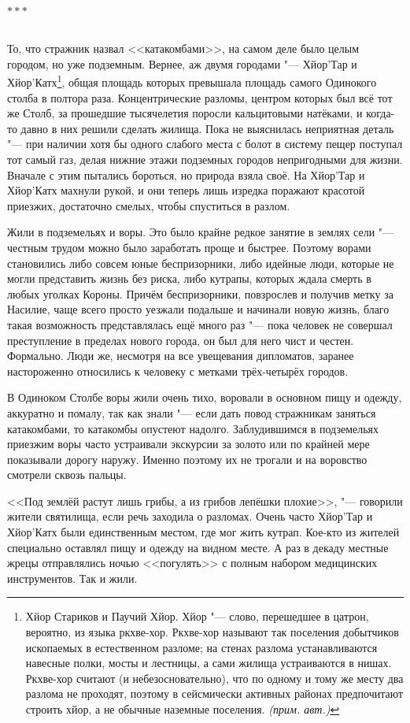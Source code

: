 \documentclass[a4paper,10pt]{book}
\newcommand{\razd}{~\\{\centering\Large\bfseries$\ast \ast \ast$\par}~\\}
\newcommand{\authornote}{\textit{(прим. авт.)}}
\begin{document}
\razd

То, что стражник назвал <<катакомбами>>, на самом деле было целым городом, но уже подземным.
Вернее, аж двумя городами "--- Хйор'Тар и Хйор'Катх\footnote{Хйор Стариков и Паучий Хйор. Хйор "--- слово, перешедшее в цатрон, вероятно, из языка ркхве-хор. Ркхве-хор называют так поселения добытчиков ископаемых в естественном разломе; на стенах разлома устанавливаются навесные полки, мосты и лестницы, а сами жилища устраиваются в нишах. Ркхве-хор считают (и небезосновательно), что по одному и тому же месту два разлома не проходят, поэтому в сейсмически активных районах предпочитают строить хйор, а не обычные наземные поселения. \authornote}, общая площадь которых превышала площадь самого Одинокого столба в полтора раза.
Концентрические разломы, центром которых был всё тот же Столб, за прошедшие тысячелетия поросли кальцитовыми натёками, и когда-то давно в них решили сделать жилища.
Пока не выяснилась неприятная деталь "--- при наличии хотя бы одного слабого места с болот в систему пещер поступал тот самый газ, делая нижние этажи подземных городов непригодными для жизни.
Вначале с этим пытались бороться, но природа взяла своё.
На Хйор'Тар и Хйор'Катх махнули рукой, и они теперь лишь изредка поражают красотой приезжих, достаточно смелых, чтобы спуститься в разлом.

Жили в подземельях и воры. Это было крайне редкое занятие в землях сели "--- честным трудом можно было заработать проще и быстрее. Поэтому ворами становились либо совсем юные беспризорники, либо идейные люди, которые не могли представить жизнь без риска, либо кутрапы, которых ждала смерть в любых уголках Короны. Причём беспризорники, повзрослев и получив метку за Насилие, чаще всего просто уезжали подальше и начинали новую жизнь, благо такая возможность представлялась ещё много раз "--- пока человек не совершал преступление в пределах нового города, он был для него чист и честен. Формально. Люди же, несмотря на все увещевания дипломатов, заранее настороженно относились к человеку с метками трёх-четырёх городов.

В Одиноком Столбе воры жили очень тихо, воровали в основном пищу и одежду, аккуратно и помалу, так как знали "--- если дать повод стражникам заняться катакомбами, то катакомбы опустеют надолго. Заблудившимся в подземельях приезжим воры часто устраивали экскурсии за золото или по крайней мере показывали дорогу наружу. Именно поэтому их не трогали и на воровство смотрели сквозь пальцы.

<<Под землёй растут лишь грибы, а из грибов лепёшки плохие>>, "--- говорили жители святилища, если речь заходила о разломах. Очень часто Хйор'Тар и Хйор'Катх были единственным местом, где мог жить кутрап. Кое-кто из жителей специально оставлял пищу и одежду на видном месте. А раз в декаду местные жрецы отправлялись ночью <<погулять>> с полным набором медицинских инструментов. Так и жили.
\end{document}
